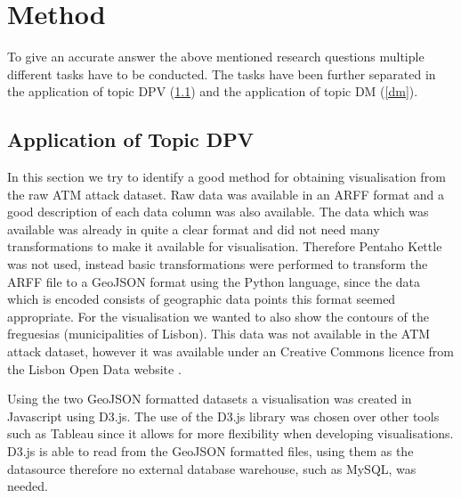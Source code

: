 \documentclass[conference]{IEEEtran}
\begin{document}


\section{Method} \label{method}
To give an accurate answer the above mentioned research questions multiple different tasks have to be conducted. The tasks have been further separated in the application of topic DPV (\ref{dpv}) and the application of topic DM (\ref{dm}).

\subsection{Application of Topic DPV} \label{dpv}
In this section we try to identify a good method for obtaining visualisation from the raw ATM attack dataset. Raw data was available in an ARFF format and a good description of each data column was also available. The data which was available was already in quite a clear format and did not need many transformations to make it available for visualisation. Therefore Pentaho Kettle was not used, instead basic transformations were performed to transform the ARFF file to a GeoJSON format using the Python language, since the data which is encoded consists of geographic data points this format seemed appropriate. For the visualisation we wanted to also show the contours of the freguesias (municipalities of Lisbon). This data was not available in the ATM attack dataset, however it was available under an Creative Commons licence from the Lisbon Open Data website \cite{c4}.

Using the two GeoJSON formatted datasets a visualisation was created in Javascript using D3.js. \cite{c5} The use of the D3.js library was chosen over other tools such as Tableau since it allows for more flexibility when developing visualisations. D3.js is able to read from the GeoJSON formatted files, using them as the datasource therefore no external database warehouse, such as MySQL, was needed. 
\end{document}
